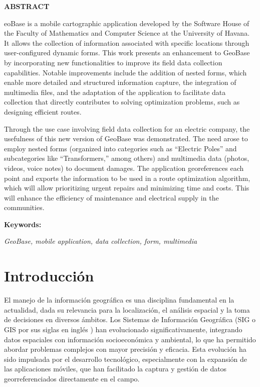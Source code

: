 \documentclass[12pt, a4paper]{book}
\newenvironment{abstractpage}[1]{ %
  \clearpage
  \thispagestyle{empty}
  \selectlanguage{english} %
  \begin{center}
    {\LARGE\bfseries ABSTRACT} \\[1.5cm]
  \end{center}
  \setlength{\parskip}{1em} %
}{
  \vspace{1cm}
  \noindent
  \textbf{Keywords:} \\[0.3cm]
  \hspace*{1.5cm} %
  \begin{minipage}{0.8\textwidth}
    \textit{GeoBase, mobile application, data collection, form, multimedia}
  \end{minipage}
  \selectlanguage{spanish} %
  \newpage
}
\begin{document}
\begin{abstractpage}
  
  GeoBase is a mobile cartographic application developed by the Software House of the Faculty of Mathematics and Computer Science at the University of Havana. It allows the collection of information associated with specific locations through user-configured dynamic forms. This work presents an enhancement to GeoBase by incorporating new functionalities to improve its field data collection capabilities. Notable improvements include the addition of nested forms, which enable more detailed and structured information capture, the integration of multimedia files, and the adaptation of the application to facilitate data collection that directly contributes to solving optimization problems, such as designing efficient routes.

  Through the use case involving field data collection for an electric company, the usefulness of this new version of GeoBase was demonstrated. The need arose to employ nested forms (organized into categories such as “Electric Poles” and subcategories like “Transformers,” among others) and multimedia data (photos, videos, voice notes) to document damages. The application georeferences each point and exports the information to be used in a route optimization algorithm, which will allow prioritizing urgent repairs and minimizing time and costs. This will enhance the efficiency of maintenance and electrical supply in the communities.

  \end{abstractpage}

\tableofcontents

\listoffigures

\chapter{Introducción}

El manejo de la información geográfica es una disciplina fundamental en la actualidad, dada su relevancia para la localización, el análisis espacial y la toma de decisiones en diversos ámbitos. Los Sistemas de Información Geográfica (SIG o GIS por sus siglas en inglés \cite{sarria2020}) han evolucionado significativamente, integrando datos espaciales con información socioeconómica y ambiental, lo que ha permitido abordar problemas complejos con mayor precisión y eficacia. Esta evolución ha sido impulsada por el desarrollo tecnológico, especialmente con la expansión de las aplicaciones móviles, que han facilitado la captura y gestión de datos georreferenciados directamente en el campo.
\end{document}
